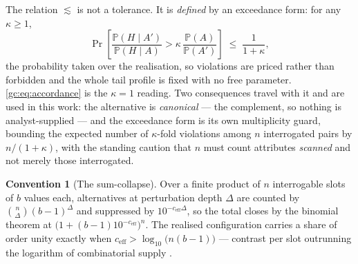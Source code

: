 \documentclass[11pt]{article}
\numberwithin{equation}{section}
\theoremstyle{plain}
\theoremstyle{definition}
\newtheorem{convention}[theorem]{Convention}
\theoremstyle{remark}
\newcommand{\PP}{\mathbb{P}}
\begin{document}
The relation $\lesssim$ is not a tolerance. It is \emph{defined} by an
exceedance form: for any $\kappa\ge1$,
\begin{equation}\label{gc:eq:accordexceed}
\Pr\left[\frac{\PP(H\mid A')}{\PP(H\mid A)}>
\kappa\,\frac{\PP(A)}{\PP(A')}\right]\;\le\;\frac{1}{1+\kappa},
\end{equation}
the probability taken over the realisation, so violations are priced
rather than forbidden and the whole tail profile is fixed with no free
parameter. \eqref{gc:eq:accordance} is the $\kappa=1$ reading. Two
consequences travel with it and are used in this work: the alternative
is \emph{canonical} --- the complement, so nothing is analyst-supplied
--- and the exceedance form is its own multiplicity guard, bounding the
expected number of $\kappa$-fold violations among $n$ interrogated pairs
by $n/(1+\kappa)$, with the standing caution that $n$ must count
attributes \emph{scanned} and not merely those interrogated.

\begin{convention}[The sum-collapse]\label{gc:conv:collapse}
Over a finite product of $n$ interrogable slots of $b$ values each,
alternatives at perturbation depth $\Delta$ are counted by
$\binom{n}{\Delta}(b-1)^{\Delta}$ and suppressed by
$10^{-c_{\mathrm{eff}}\Delta}$, so the total closes by the binomial
theorem at $\bigl(1+(b-1)10^{-c_{\mathrm{eff}}}\bigr)^{n}$. The realised
configuration carries a share of order unity exactly when
$c_{\mathrm{eff}}>\log_{10}\bigl(n(b-1)\bigr)$ --- contrast per slot
outrunning the logarithm of combinatorial supply \cite{Ben26Optimal}.
\end{convention}
\end{document}
